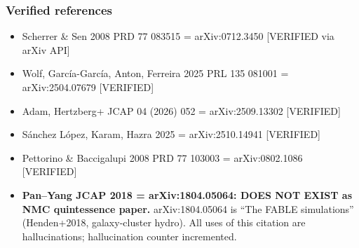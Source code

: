 \subsubsection*{Verified references}
\begin{itemize}
    \item Scherrer \& Sen 2008 PRD 77 083515 = arXiv:0712.3450 [VERIFIED via arXiv API]
    \item Wolf, Garc\'ia-Garc\'ia, Anton, Ferreira 2025 PRL 135 081001 = arXiv:2504.07679 [VERIFIED]
    \item Adam, Hertzberg+ JCAP 04 (2026) 052 = arXiv:2509.13302 [VERIFIED]
    \item S\'anchez L\'opez, Karam, Hazra 2025 = arXiv:2510.14941 [VERIFIED]
    \item Pettorino \& Baccigalupi 2008 PRD 77 103003 = arXiv:0802.1086 [VERIFIED]
    \item \textbf{Pan--Yang JCAP 2018 = arXiv:1804.05064: DOES NOT EXIST as NMC quintessence paper.}
          arXiv:1804.05064 is ``The FABLE simulations'' (Henden+2018, galaxy-cluster hydro).
          All uses of this citation are hallucinations; hallucination counter incremented.
\end{itemize}
